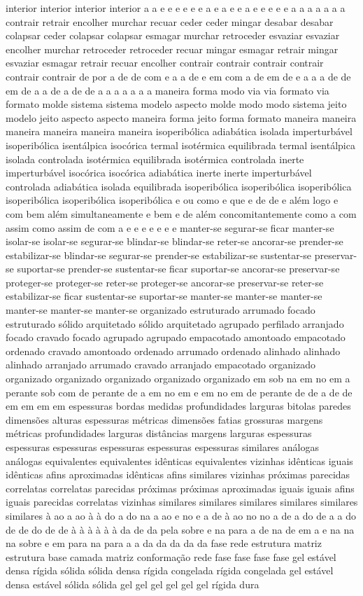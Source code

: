 interior interior interior interior a a e e e e e e a e a e e a e e e e e a a a a a a a contrair retrair encolher murchar recuar ceder ceder mingar desabar desabar colapsar ceder colapsar colapsar esmagar murchar retroceder esvaziar esvaziar encolher murchar retroceder retroceder recuar mingar esmagar retrair mingar esvaziar esmagar retrair recuar encolher contrair contrair contrair contrair contrair contrair de por a de de com e a a de e em com a de em de e a a a de de em de a a de a de de a a a a a a a maneira forma modo via via formato via formato molde sistema sistema modelo aspecto molde modo modo sistema jeito modelo jeito aspecto aspecto maneira forma jeito forma formato maneira maneira maneira maneira maneira maneira isoperibólica adiabática isolada imperturbável isoperibólica isentálpica isocórica termal isotérmica equilibrada termal isentálpica isolada controlada isotérmica equilibrada isotérmica controlada inerte imperturbável isocórica isocórica adiabática inerte inerte imperturbável controlada adiabática isolada equilibrada isoperibólica isoperibólica isoperibólica isoperibólica isoperibólica isoperibólica e ou como e que e de de e além logo e com bem além simultaneamente e bem e de além concomitantemente como a com assim como assim de com a e e e e e e e manter-se segurar-se ficar manter-se isolar-se isolar-se segurar-se blindar-se blindar-se reter-se ancorar-se prender-se estabilizar-se blindar-se segurar-se prender-se estabilizar-se sustentar-se preservar-se suportar-se prender-se sustentar-se ficar suportar-se ancorar-se preservar-se proteger-se proteger-se reter-se proteger-se ancorar-se preservar-se reter-se estabilizar-se ficar sustentar-se suportar-se manter-se manter-se manter-se manter-se manter-se manter-se organizado estruturado arrumado focado estruturado sólido arquitetado sólido arquitetado agrupado perfilado arranjado focado cravado focado agrupado agrupado empacotado amontoado empacotado ordenado cravado amontoado ordenado arrumado ordenado alinhado alinhado alinhado arranjado arrumado cravado arranjado empacotado organizado organizado organizado organizado organizado organizado em sob na em no em a perante sob com de perante de a em no em e em no em de perante de de a de de em em em em espessuras bordas medidas profundidades larguras bitolas paredes dimensões alturas espessuras métricas dimensões fatias grossuras margens métricas profundidades larguras distâncias margens larguras espessuras espessuras espessuras espessuras espessuras espessuras similares análogas análogas equivalentes equivalentes idênticas equivalentes vizinhas idênticas iguais idênticas afins aproximadas idênticas afins similares vizinhas próximas parecidas correlatas correlatas parecidas próximas próximas aproximadas iguais iguais afins iguais parecidas correlatas vizinhas similares similares similares similares similares similares à ao a ao à à do a do na a ao e no e a de à ao no no a de a do de a a do de de do de de à à à à à à da de da pela sobre e na para a de na de em a e na na na sobre e em para na para a a da da da da da fase rede estrutura matriz estrutura base camada matriz conformação rede fase fase fase fase gel estável densa rígida sólida sólida densa rígida congelada rígida congelada gel estável densa estável sólida sólida gel gel gel gel gel gel rígida dura 